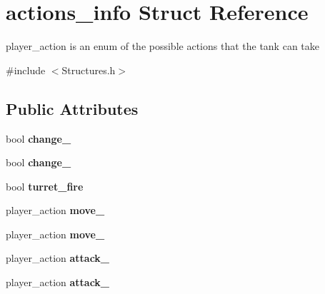 \hypertarget{structactions__info}{\section{actions\+\_\+info Struct Reference}
\label{structactions__info}
}


player\+\_\+action is an enum of the possible actions that the tank can take  




{\ttfamily \#include $<$Structures.\+h$>$}

\subsection*{Public Attributes}
\begin{DoxyCompactItemize}
\item 
\hypertarget{structactions__info_a69ac673533838f973f09492a12516816}{bool {\bfseries change\+\_}}\label{structactions__info_a69ac673533838f973f09492a12516816}

\item 
\hypertarget{structactions__info_a0f20d9c244d92a71dad9cf8ce10cd2f2}{bool {\bfseries change\+\_}}\label{structactions__info_a0f20d9c244d92a71dad9cf8ce10cd2f2}

\item 
\hypertarget{structactions__info_afd5886948959786f75255fccbc965154}{bool {\bfseries turret\+\_\+fire}}\label{structactions__info_afd5886948959786f75255fccbc965154}

\item 
\hypertarget{structactions__info_a5cb853144009b2bfb7e58c7bf43e2a42}{player\+\_\+action {\bfseries move\+\_}}\label{structactions__info_a5cb853144009b2bfb7e58c7bf43e2a42}

\item 
\hypertarget{structactions__info_adf9ed4a9ad4b604295846d06872e0ebf}{player\+\_\+action {\bfseries move\+\_}}\label{structactions__info_adf9ed4a9ad4b604295846d06872e0ebf}

\item 
\hypertarget{structactions__info_a722a3805cc06ba6e5f9627b942f9bbf2}{player\+\_\+action {\bfseries attack\+\_}}\label{structactions__info_a722a3805cc06ba6e5f9627b942f9bbf2}

\item 
\hypertarget{structactions__info_a9bfb93ce33b8969b45fa72a12b89be89}{player\+\_\+action {\bfseries attack\+\_}}\label{structactions__info_a9bfb93ce33b8969b45fa72a12b89be89}

\end{DoxyCompactItemize}


